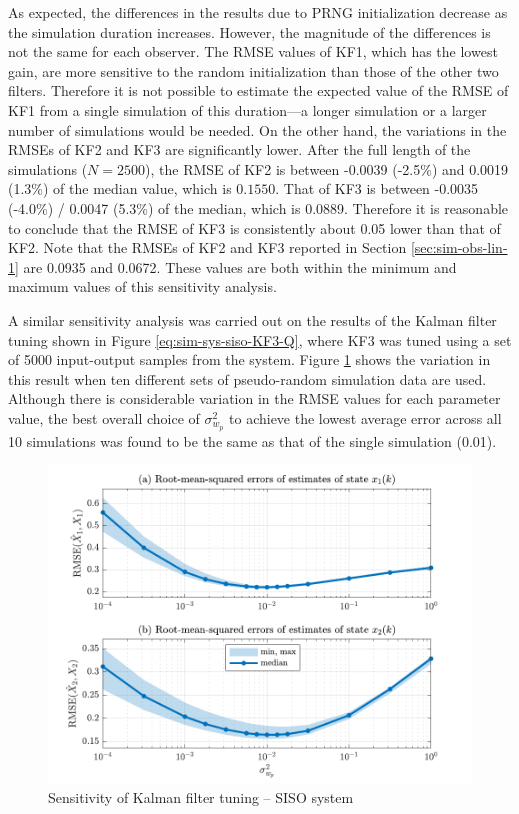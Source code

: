 As expected, the differences in the results due to \gls{PRNG} initialization decrease as the simulation duration increases. However, the magnitude of the differences is not the same for each observer. The \gls{RMSE} values of KF1, which has the lowest gain, are more sensitive to the random initialization than those of the other two filters. Therefore it is not possible to estimate the expected value of the \gls{RMSE} of KF1 from a single simulation of this duration---a longer simulation or a larger number of simulations would be needed. On the other hand, the variations in the \gls{RMSE}s of KF2 and KF3 are significantly lower. After the full length of the simulations ($N=2500$), the \gls{RMSE} of KF2 is between -0.0039 (-2.5\%) and 0.0019 (1.3\%) of the median value, which is $0.1550$.  That of KF3 is between -0.0035 (-4.0\%) / 0.0047 (5.3\%) of the median, which is 0.0889.  Therefore it is reasonable to conclude that the \gls{RMSE} of KF3 is consistently about 0.05 lower than that of KF2. Note that the \gls{RMSE}s of KF2 and KF3 reported in Section \ref{sec:sim-obs-lin-1} are 0.0935 and 0.0672. These values are both within the minimum and maximum values of this sensitivity analysis.

A similar sensitivity analysis was carried out on the results of the Kalman filter tuning shown in Figure \ref{eq:sim-sys-siso-KF3-Q}, where KF3 was tuned using a set of 5000 input-output samples from the system. Figure \ref{fig:sim-sys-siso-KF3-sensitivity} shows the variation in this result when ten different sets of pseudo-random simulation data are used.  Although there is considerable variation in the \gls{RMSE} values for each parameter value, the best overall choice of $\sigma_{w_p}^2$ to achieve the lowest average error across all 10 simulations was found to be the same as that of the single simulation (0.01).
\begin{figure}[htp]
	\centering
	\includegraphics[width=14cm]{images/rod_obs_sim1_3KF_Q_statplot.pdf}
	\caption{Sensitivity of Kalman filter tuning – \acrshort{SISO} system}
	\label{fig:sim-sys-siso-KF3-sensitivity}
\end{figure}


